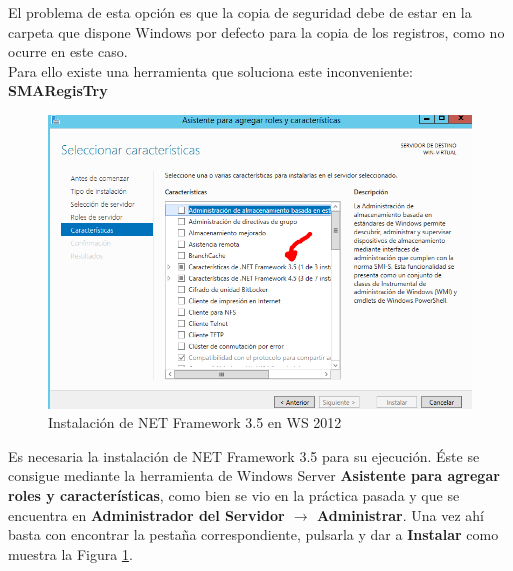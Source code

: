 	El problema de esta opción es que la copia de seguridad debe de estar en la carpeta que dispone Windows por defecto para la copia de los registros, como no ocurre en este caso.\\
	
	Para ello existe una herramienta que soluciona este inconveniente: \textbf{SMARegisTry}\cite{enlace8}
		\begin{figure}[H] %
			\centering
			\includegraphics[scale=0.6]{figuras/ejercicio3/figura3-9.png} 
			\caption{Instalación de NET Framework 3.5 en WS 2012} 
			\label{fig:figura3-9}
		\end{figure}
	
	Es necesaria la instalación de NET Framework 3.5 para su ejecución. Éste se consigue mediante la herramienta de Windows Server \textbf{Asistente para agregar roles y características}, como bien se vio en la práctica pasada y que se encuentra en \textbf{Administrador del Servidor $ \rightarrow $ Administrar}. 
	Una vez ahí basta con encontrar la pestaña correspondiente, pulsarla y dar a \textbf{Instalar} como muestra la Figura \ref{fig:figura3-9}.
	\\
	
